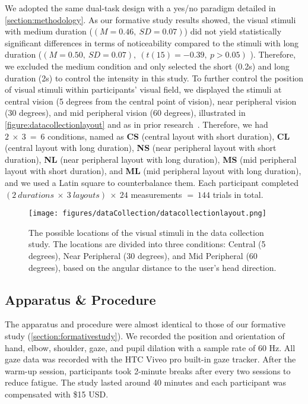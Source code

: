 We adopted the same dual-task design with a yes/no paradigm detailed in \autoref{section:methodology}.
As our formative study results showed, the visual stimuli with medium duration ($(M=0.46,~SD=0.07)$) did not yield statistically significant differences in terms of noticeability compared to the stimuli with long duration ($(M=0.50,~SD=0.07),~(t(15)=-0.39,~p>0.05)$ ).
Therefore, we excluded the medium condition and only selected the short (0.2s) and long duration (2s) to control the intensity in this study.
To further control the position of visual stimuli within participants' visual field, we displayed the stimuli at central vision (5 degrees from the central point of vision), near peripheral vision (30 degrees), and mid peripheral vision (60 degrees), illustrated in \autoref{figure:datacollectionlayout} and as in prior research~\cite{grosvenor2007primary, gutwin2017peripheral}.
Therefore, we had $2~\times~3~=~6$ conditions, named as \textbf{CS} (central layout with short duration), \textbf{CL} (central layout with long duration), \textbf{NS} (near peripheral layout with short duration), \textbf{NL} (near peripheral layout with long duration), \textbf{MS} (mid peripheral layout with short duration), and \textbf{ML} (mid peripheral layout with long duration), and we used a Latin square to counterbalance them.
Each participant completed $(2~durations~\times~3~layouts)~\times~24$ measurements $=~144$ trials in total. 

\begin{figure}[!htbp]
    \centering
    \texttt{[image: figures/dataCollection/datacollectionlayout.png]}
    \caption{The possible locations of the visual stimuli in the data collection study.
    The locations are divided into three conditions: Central (5 degrees), Near Peripheral (30 degrees), and Mid Peripheral (60 degrees), based on the angular distance to the user's head direction.}
    \label{figure:datacollectionlayout}
\end{figure}


\subsection{Apparatus \& Procedure}
The apparatus and procedure were almost identical to those of our formative study (\autoref{section:formativestudy}). 
We recorded the position and orientation of hand, elbow, shoulder, gaze, and pupil dilation with a sample rate of 60 Hz.
All gaze data was recorded with the HTC Viveo pro built-in gaze tracker.
After the warm-up session, participants took 2-minute breaks after every two sessions to reduce fatigue.
The study lasted around 40 minutes and each participant was compensated with \$15 USD.

